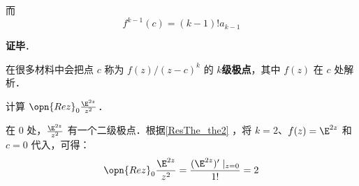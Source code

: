 而
\begin{equation}
f^{k-1}(c)=(k-1)!a_{k-1}
\end{equation}

\textbf{证毕}．




在很多材料中会把点 $c$ 称为 $f(z)/(z-c)^k$ 的 $k$\textbf{级极点}，其中 $f(z)$ 在 $c$ 处解析．

\begin{example}{}
计算 $\opn{Rez}_0 \frac{\E^{2z}}{z^2}$．

在 $0$ 处，$\frac{\E^{2z}}{z^2}$ 有一个二级极点．根据\autoref{ResThe_the2} ，将 $k=2$、$f(z)=\E^{2z}$ 和 $c=0$ 代入，可得：
\begin{equation}
\opn{Rez}_0\frac{\E^{2z}}{z^2}=\frac{(\E^{2z})'\mid_{z=0}}{1!}=2
\end{equation}


\end{example}













